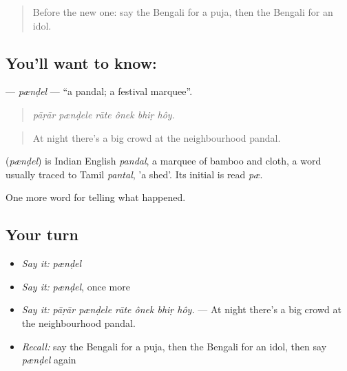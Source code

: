 \begin{quote}
Before the new one: say the Bengali for a puja, then the Bengali for an idol.
\end{quote}

\subsection*{You'll want to know: }
\textbf{} — \emph{pænḍel} — \textquotedblleft{}a pandal; a festival marquee\textquotedblright{}.

\begin{quote}
     
\end{quote}

\begin{quote}
\emph{pāṛār pænḍele rāte ônek bhiṛ hôy.}
\end{quote}

\begin{quote}
At night there's a big crowd at the neighbourhood pandal.
\end{quote}

\begin{cousinweb}
\textbf{} (\emph{pænḍel}) is Indian English \emph{pandal}, a marquee of bamboo and cloth, a word usually traced to Tamil \emph{pantal}, 'a shed'. Its initial  is read \emph{pæ}.
\end{cousinweb}

\begin{grammarlens}[title={What you've built}]
One more word for telling what happened.
\end{grammarlens}

\subsection*{Your turn}
\begin{itemize}
\raggedright
  \item \emph{Say it:} \emph{pænḍel}
  \item \emph{Say it:} \emph{pænḍel}, once more
  \item \emph{Say it:} \emph{pāṛār pænḍele rāte ônek bhiṛ hôy.} — At night there's a big crowd at the neighbourhood pandal.
  \item \emph{Recall:} say the Bengali for a puja, then the Bengali for an idol, then say \emph{pænḍel} again
\end{itemize}

